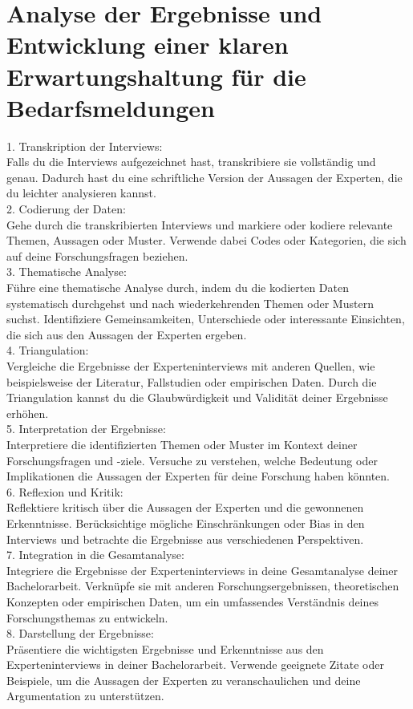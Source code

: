 \section{Analyse der Ergebnisse und Entwicklung einer klaren Erwartungshaltung für die Bedarfsmeldungen}

1. Transkription der Interviews:\\
Falls du die Interviews aufgezeichnet hast, transkribiere sie vollständig und genau. Dadurch hast du eine schriftliche Version der Aussagen der Experten, die du leichter analysieren kannst.\\

2. Codierung der Daten:\\
Gehe durch die transkribierten Interviews und markiere oder kodiere relevante Themen, Aussagen oder Muster. Verwende dabei Codes oder Kategorien, die sich auf deine Forschungsfragen beziehen.\\

3. Thematische Analyse:\\
Führe eine thematische Analyse durch, indem du die kodierten Daten systematisch durchgehst und nach wiederkehrenden Themen oder Mustern suchst. Identifiziere Gemeinsamkeiten, Unterschiede oder interessante Einsichten, die sich aus den Aussagen der Experten ergeben.\\

4. Triangulation:\\
Vergleiche die Ergebnisse der Experteninterviews mit anderen Quellen, wie beispielsweise der Literatur, Fallstudien oder empirischen Daten. Durch die Triangulation kannst du die Glaubwürdigkeit und Validität deiner Ergebnisse erhöhen.\\

5. Interpretation der Ergebnisse:\\
Interpretiere die identifizierten Themen oder Muster im Kontext deiner Forschungsfragen und -ziele. Versuche zu verstehen, welche Bedeutung oder Implikationen die Aussagen der Experten für deine Forschung haben könnten.\\

6. Reflexion und Kritik:\\
Reflektiere kritisch über die Aussagen der Experten und die gewonnenen Erkenntnisse. Berücksichtige mögliche Einschränkungen oder Bias in den Interviews und betrachte die Ergebnisse aus verschiedenen Perspektiven.\\

7. Integration in die Gesamtanalyse:\\
Integriere die Ergebnisse der Experteninterviews in deine Gesamtanalyse deiner Bachelorarbeit. Verknüpfe sie mit anderen Forschungsergebnissen, theoretischen Konzepten oder empirischen Daten, um ein umfassendes Verständnis deines Forschungsthemas zu entwickeln.\\

8. Darstellung der Ergebnisse:\\
Präsentiere die wichtigsten Ergebnisse und Erkenntnisse aus den Experteninterviews in deiner Bachelorarbeit. Verwende geeignete Zitate oder Beispiele, um die Aussagen der Experten zu veranschaulichen und deine Argumentation zu unterstützen.
\newpage
